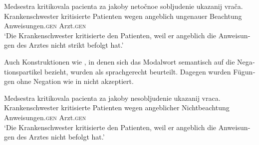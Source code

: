 \documentclass[output=paper]{langscibook}
\begin{document}
\begin{otherlanguage}{german}
\newpage
\ex \label{ex:zi83:17}
    \gll Medsestra kritikovala pacienta za jakoby netočnoe sobljudenie ukazanij vrača. \\
     Krankenschwester kritisierte  Patienten wegen angeblich ungenauer Beachtung  Anweisungen.\textsc{gen}  Arzt.\textsc{gen} \\
    \glt ‘Die Krankenschwester kritisierte den Patienten, weil er angeblich die Anweisungen des Arztes nicht strikt befolgt hat.’
\z

\noindent Auch Konstruktionen wie , in denen sich das Modalwort semantisch auf die Negationspartikel bezieht, wurden als sprachgerecht beurteilt. Dagegen wurden Fügungen ohne Negation wie in  nicht akzeptiert.

\ea \label{ex:zi83:18}
    \gll Medsestra kritikovala pacienta za jakoby nesobljudenie ukazanij vraca. \\
    Krankenschwester kritisierte  Patienten wegen angeblicher Nichtbeachtung  Anweisungen.\textsc{gen} Arzt.\textsc{gen} \\
    \glt ‘Die Krankenschwester kritisierte den Patienten, weil er angeblich die Anweisungen des Arztes nicht befolgt hat.’
\z

\z



    

\end{otherlanguage}
\end{document}
